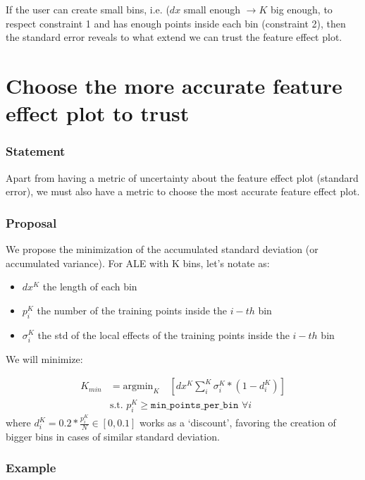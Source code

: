 \documentclass{article}
\begin{document}
If the user can create small bins, i.e. (\(dx\) small enough
\(\rightarrow K \) big enough, to respect constraint 1 and has enough
points inside each bin (constraint 2), then the standard error reveals
to what extend we can trust the feature effect plot.

\section{Choose the more accurate feature effect plot to trust}

\subsubsection*{Statement}

Apart from having a metric of uncertainty about the feature effect
plot (standard error), we must also have a metric to choose the most
accurate feature effect plot.

\subsubsection*{Proposal}

We propose the minimization of the accumulated standard deviation (or
accumulated variance). For ALE with K bins, let's notate as:

\begin{itemize}
\item \(dx^K\) the length of each bin
\item \(p_i^K \) the number of the training points inside the \(i-th\) bin
\item \(\sigma_i^K \) the std of the local effects of the training points inside the \(i-th\) bin
\end{itemize}
%
We will minimize:

\begin{align} \label{eq:min-criterion}
  K_{min} &= \text{argmin}_{K} \quad  [dx^K  \sum_i^K \sigma_i^K * (1 - d_i^K)]\\
  & \text{s.t. } p_i^K \geq \texttt{min\_points\_per\_bin } \forall i
\end{align}
%
where \(d_i^K = 0.2 * \frac{p_i^K}{N} \in [0,0.1] \) works as a `discount', favoring the
creation of bigger bins in cases of similar standard deviation.

\subsubsection*{Example}
\end{document}
